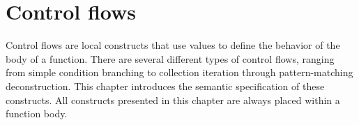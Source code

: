 \chapter{Control flows}%
\pagecolor{gray!10!white}

\label{chap:chap7}

Control flows are local constructs that use values to define the behavior of the
body of a function. There are several different types of control flows, ranging
from simple condition branching to collection iteration through pattern-matching
deconstruction. This chapter introduces the semantic specification of these
constructs. All constructs presented in this chapter are always placed within a
function body.

\minitoc%











